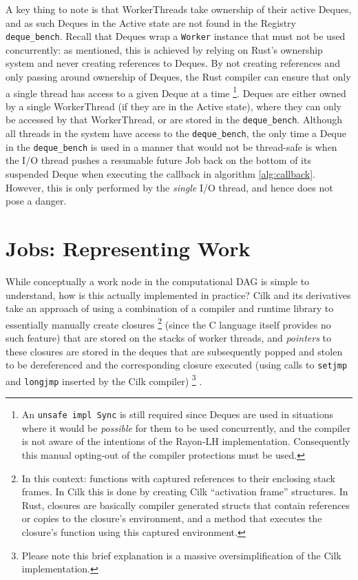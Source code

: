 \documentclass[bsc,frontabs,singlespacing,parskip,deptreport,normalheadings]{infthesis}
\begin{document}
A key thing to note is that WorkerThreads take ownership of their active Deques,
and as such Deques in the Active state are not found in the Registry
\texttt{deque\_bench}. Recall that Deques wrap a \texttt{Worker} instance that
must not be used concurrently: as mentioned, this is achieved by relying on
Rust's ownership system and never creating references to Deques. By not creating
references and only passing around ownership of Deques, the Rust compiler can
ensure that only a single thread has access to a given Deque at a time
\footnote{An \texttt{unsafe impl Sync} is still required since Deques are used
in situations where it would be \textit{possible} for them to be used
concurrently, and the compiler is not aware of the intentions of the Rayon-LH
implementation. Consequently this manual opting-out of the compiler protections
must be used.}. Deques are either owned by a single WorkerThread (if they are in
the Active state), where they can only be accessed by that WorkerThread, or are
stored in the \texttt{deque\_bench}. Although all threads in the system have
access to the \texttt{deque\_bench}, the only time a Deque in the
\texttt{deque\_bench} is used in a manner that would not be thread-safe is when
the I/O thread pushes a resumable future Job back on the bottom of its suspended
Deque when executing the callback in algorithm \ref{alg:callback}. However, this
is only performed by the \textit{single} I/O thread, and hence does not pose a
danger.

\section{Jobs: Representing Work}
\label{section:jobs:_representing_work}

While conceptually a work node in the computational DAG is simple to understand,
how is this actually implemented in practice? Cilk and its derivatives take an
approach of using a combination of a compiler and runtime library to essentially
manually create closures \footnote{In this context: functions with captured
    references to their enclosing stack frames. In Cilk this is done by creating
    Cilk ``activation frame'' structures. In Rust, closures are basically compiler
    generated structs that contain references or copies to the closure's
    environment, and a method that executes the closure's function using this
captured environment.} (since the C language itself provides no such feature)
that are stored on the stacks of worker threads, and \textit{pointers} to these
closures are stored in the deques that are subsequently popped and stolen to be
dereferenced and the corresponding closure executed (using calls to
\texttt{setjmp} and \texttt{longjmp} inserted by the Cilk compiler)
\footnote{Please note this brief explanation is a massive oversimplification of
the Cilk implementation.} \cite{frigo_implementation_1998}.
\end{document}
